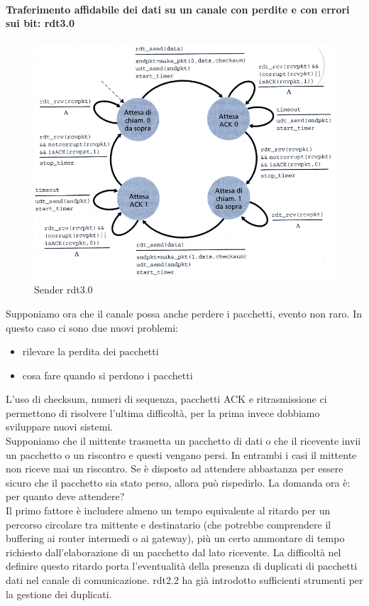 \documentclass[11pt,a4paper]{article}
\begin{document}
\paragraph{Traferimento affidabile dei dati su un canale con perdite e con errori sui bit: rdt3.0}
\begin{figure}
	\includegraphics[scale=0.6]{img/021.png}
	\caption{Sender rdt3.0}
\end{figure}
Supponiamo ora che il canale possa anche perdere i pacchetti, evento non raro. In questo caso ci sono due nuovi problemi:
\begin{itemize}
	\item rilevare la perdita dei pacchetti
	\item cosa fare quando si perdono i pacchetti
\end{itemize}
L'uso di checksum, numeri di sequenza, pacchetti ACK e ritrasmissione ci permettono di risolvere l'ultima difficoltà, per la prima invece dobbiamo sviluppare nuovi sistemi. \\
Supponiamo che il mittente trasmetta un pacchetto di dati o che il ricevente invii un pacchetto o un riscontro e questi vengano persi. In entrambi i casi il mittente non riceve mai un riscontro. Se è disposto ad attendere abbastanza per essere sicuro che il pacchetto sia stato perso, allora può rispedirlo. La domanda ora è: per quanto deve attendere? \\
Il primo fattore è includere almeno un tempo equivalente al ritardo per un percorso circolare tra mittente e destinatario (che potrebbe comprendere il buffering ai router intermedi o ai gateway), più un certo ammontare di tempo richiesto dall'elaborazione di un pacchetto dal lato ricevente. La difficoltà nel definire questo ritardo porta l'eventualità della presenza di duplicati di pacchetti dati nel canale di comunicazione. rdt2.2 ha già introdotto sufficienti strumenti per la gestione dei duplicati. \\
\end{document}
